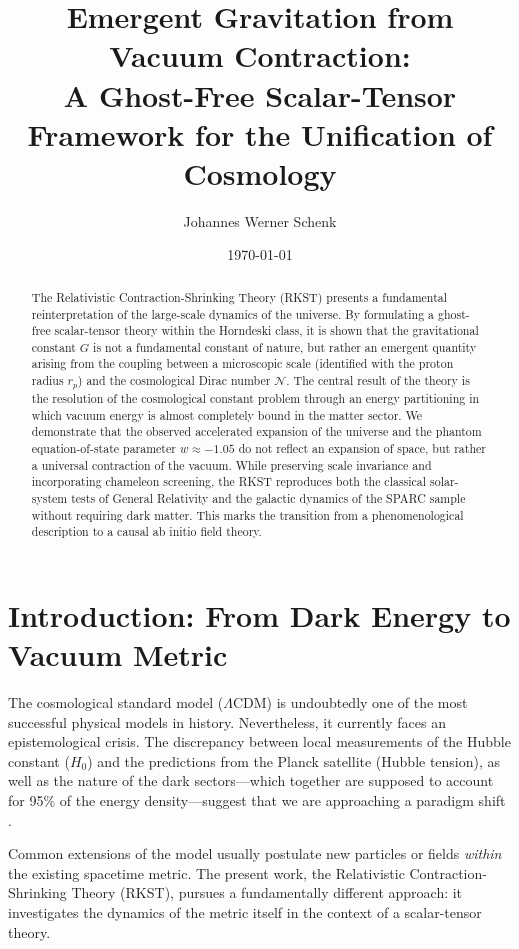 \documentclass[11pt,a4paper]{article}
\title{\Large \textbf{Emergent Gravitation from Vacuum Contraction: \\ A Ghost-Free Scalar-Tensor Framework for the Unification of Cosmology}}
\author{Johannes Werner Schenk}
\date{\today}
\begin{document}
\maketitle

\begin{abstract}
The Relativistic Contraction-Shrinking Theory (RKST) presents a fundamental reinterpretation of the large-scale dynamics of the universe. By formulating a ghost-free scalar-tensor theory within the Horndeski class, it is shown that the gravitational constant $G$ is not a fundamental constant of nature, but rather an emergent quantity arising from the coupling between a microscopic scale (identified with the proton radius $r_p$) and the cosmological Dirac number $\mathcal{N}$. The central result of the theory is the resolution of the cosmological constant problem through an energy partitioning in which vacuum energy is almost completely bound in the matter sector. We demonstrate that the observed accelerated expansion of the universe and the phantom equation-of-state parameter $w \approx -1.05$ do not reflect an expansion of space, but rather a universal contraction of the vacuum. While preserving scale invariance and incorporating chameleon screening, the RKST reproduces both the classical solar-system tests of General Relativity and the galactic dynamics of the SPARC sample without requiring dark matter. This marks the transition from a phenomenological description to a causal ab initio field theory.
\end{abstract}

\tableofcontents

\section{Introduction: From Dark Energy to Vacuum Metric}
\label{sec:introduction}

The cosmological standard model ($\Lambda$CDM) is undoubtedly one of the most successful physical models in history. Nevertheless, it currently faces an epistemological crisis. The discrepancy between local measurements of the Hubble constant ($H_0$) and the predictions from the Planck satellite (Hubble tension), as well as the nature of the dark sectors—which together are supposed to account for 95\% of the energy density—suggest that we are approaching a paradigm shift \cite{planck}.

Common extensions of the model usually postulate new particles or fields \textit{within} the existing spacetime metric. The present work, the Relativistic Contraction-Shrinking Theory (RKST), pursues a fundamentally different approach: it investigates the dynamics of the metric itself in the context of a scalar-tensor theory.
\end{document}

